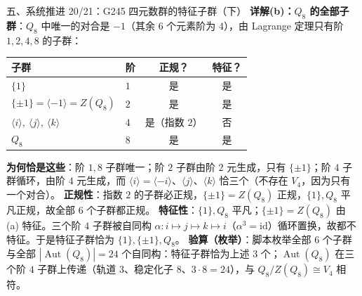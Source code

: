 \documentclass[aspectratio=169,10pt,fontset=none]{ctexbeamer}
\newcommand{\key}[1]{\textcolor{ink}{\bfseries #1}}
\begin{document}
\begin{frame}[t]{五、系统推进 20/21：G245 四元数群的特征子群（下）}
\scriptsize
\key{详解(b)：$Q_8$ 的全部子群}：$Q_8$ 中唯一的对合是 $-1$（其余 $6$ 个元素阶为 $4$），由 Lagrange 定理只有阶 $1,2,4,8$ 的子群：
\begin{center}
{\scriptsize
\begin{tabular}{@{}llcc@{}}
\toprule
子群 & 阶 & 正规？ & 特征？\\ \midrule
$\{1\}$ & $1$ & 是 & 是\\
$\{\pm1\}=\langle -1\rangle=Z(Q_8)$ & $2$ & 是 & 是\\
$\langle i\rangle,\ \langle j\rangle,\ \langle k\rangle$ & $4$ & 是（指数 $2$） & 否\\
$Q_8$ & $8$ & 是 & 是\\ \bottomrule
\end{tabular}}
\end{center}
\textbf{为何恰是这些}：阶 $1,8$ 子群唯一；阶 $2$ 子群由阶 $2$ 元生成，只有 $\{\pm1\}$；阶 $4$ 子群循环，由阶 $4$ 元生成，而 $\langle i\rangle=\langle-i\rangle$、$\langle j\rangle$、$\langle k\rangle$ 恰三个（不存在 $V_4$，因为只有一个对合）。
\textbf{正规性}：指数 $2$ 的子群必正规，$\{\pm1\}=Z(Q_8)$ 正规，$\{1\},Q_8$ 平凡正规，故全部 $6$ 个子群都正规。
\textbf{特征性}：$\{1\},Q_8$ 平凡；$\{\pm1\}=Z(Q_8)$ 由 (a) 特征。三个阶 $4$ 子群被自同构 $\alpha:i\mapsto j\mapsto k\mapsto i$（$\alpha^3=\mathrm{id}$）循环置换，故都不特征。于是特征子群恰为 $\{1\},\{\pm1\},Q_8$。
\key{验算（枚举）}：脚本枚举全部 $6$ 个子群与全部 $|\operatorname{Aut}(Q_8)|=24$ 个自同构：特征子群恰为上述 $3$ 个；$\operatorname{Aut}(Q_8)$ 在三个阶 $4$ 子群上传递（轨道 $3$、稳定化子 $8$、$3\cdot8=24$），与 $Q_8/Z(Q_8)\cong V_4$ 相符。
\end{frame}
\end{document}
